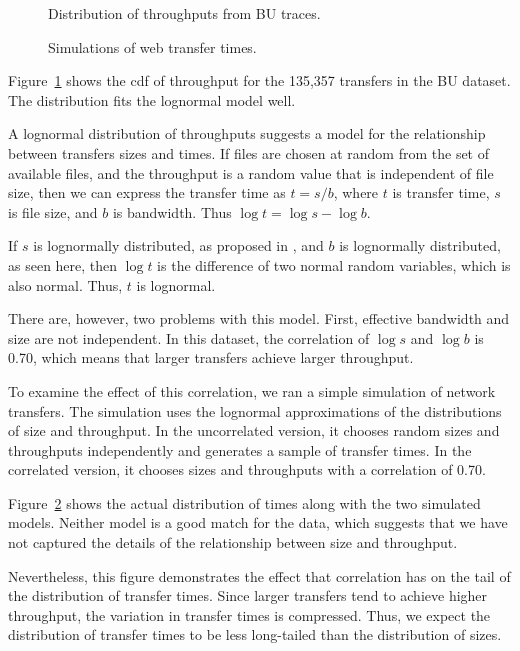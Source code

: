 \documentclass[twocolumn,11pt]{infocom}
\begin{document}
\begin{figure}[tb]
\centerline{}
\caption{Distribution of throughputs from BU traces.}
\label{fig.bu.bw}
\end{figure}

\begin{figure}[tb]
\centerline{}
\caption{Simulations of web transfer times.}
\label{fig.sim}
\end{figure}

Figure~\ref{fig.bu.bw} shows the cdf of throughput for the 135,357
transfers in the BU dataset.  The distribution fits the lognormal
model well.

A lognormal distribution of throughputs suggests
a model for the relationship between transfers sizes and times.
If files are chosen at random from
the set of available files, and the throughput is a random
value that is independent of file size, then we can express the transfer
time as $t = s / b$, where $t$ is transfer time, $s$ is file size, and
$b$ is bandwidth.  Thus $\log t = \log s - \log b$.

If $s$ is lognormally distributed, as proposed in \cite{Downey01},
and $b$ is lognormally distributed, as seen here, then
$\log t$ is the difference of two normal random variables, which
is also normal.  Thus, $t$ is lognormal.  

There are, however, two problems with this model.  First, effective
bandwidth and size are not independent.  In this dataset, the
correlation of $\log s$ and $\log b$ is 0.70, which means that
larger transfers achieve larger throughput.

To examine the effect of this correlation, we ran a simple simulation
of network transfers.  The simulation uses the lognormal
approximations of the distributions of size and throughput.  In the
uncorrelated version, it chooses random sizes and throughputs
independently and generates a sample of transfer times.  In the
correlated version, it chooses sizes and throughputs with a correlation
of 0.70.

Figure~\ref{fig.sim} shows the actual distribution of times
along with the two simulated models.  Neither model is a good match
for the data, which suggests that we have not captured the details
of the relationship between size and throughput.

Nevertheless,
this figure demonstrates the effect that correlation has on the
tail of the distribution of transfer times.  Since larger transfers
tend to achieve higher throughput, the variation in transfer times
is compressed.  Thus, we expect the distribution of transfer times
to be less long-tailed than the distribution of sizes.
\end{document}
